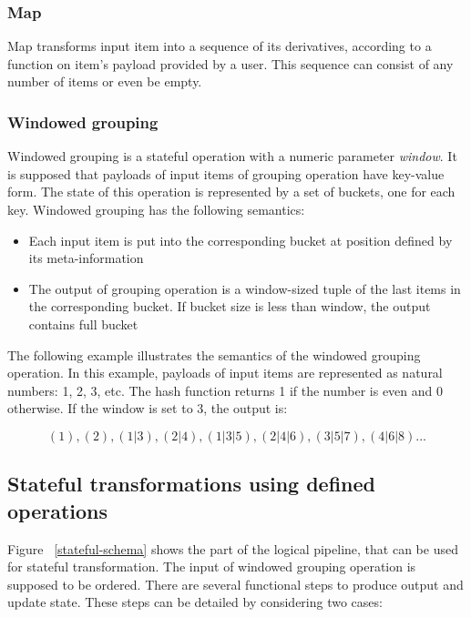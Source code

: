 \subsubsection{Map}
Map transforms input item into a sequence of its derivatives, according to a function on item's payload provided by a user. This sequence can consist of any number of items or even be empty.

\subsubsection{Windowed grouping}
Windowed grouping is a stateful operation with a numeric parameter {\it window}. It is supposed that payloads of input items of grouping operation have key-value form. The state of this operation is represented by a set of buckets, one for each key. Windowed grouping has the following semantics:

\begin{itemize}
    \item Each input item is put into the corresponding bucket at position defined by its meta-information
    \item The output of grouping operation is a window-sized tuple of the last items in the corresponding bucket. If bucket size is less than window, the output contains full bucket
\end{itemize}

The following example illustrates the semantics of the windowed grouping operation. In this example, payloads of input items are represented as natural numbers: 1, 2, 3, etc. The hash function returns 1 if the number is even and 0 otherwise. If the window is set to 3, the output is:

\[(1), (2), (1|3), (2|4), (1|3|5), (2|4|6), (3|5|7), (4|6|8)...\]

\subsection{Stateful transformations using defined operations}
Figure ~\ref{stateful-schema} shows the part of the logical pipeline, that can be used for stateful transformation. The input of windowed grouping operation is supposed to be ordered. There are several functional steps to produce output and update state. These steps can be detailed by considering two cases:

